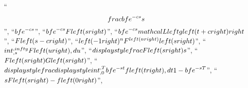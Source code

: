 \documentclass[
  letterpaper,
  DIV=11,
  numbers=noendperiod]{scrartcl}
\begin{document}
``\[\\frac{{{{\\bf{e}}^{ - cs}}}}{s}\]'', ``\({{\\bf{e}}^{ - cs}}\)'',
``\({{\\bf{e}}^{ - cs}}F\\left( s \\right)\)'',
``\({{\\bf{e}}^{ - cs}}{\\mathcal{L}}\\left\\{ {g\\left( {t + c} \\right)} \\right\\}\)'',
``\(F\\left( {s - c} \\right)\)'',
``\({\\left( { - 1} \\right)^n}{F^{\\left( n \\right)}}\\left( s \\right)\)'',
``\(\\int_{{\\,s}}^{{\\,\\infty }}{{F\\left( u \\right)\\,du}}\)'',
``\(\\displaystyle \\frac{{F\\left( s \\right)}}{s}\)'',
``\(F\\left( s \\right)G\\left( s \\right)\)'',
``\(\\displaystyle \\frac{{\\displaystyle \\int_{{\\,0}}^{{\\,T}}{{{{\\bf{e}}^{ - st}}f\\left( t \\right)\\,dt}}}}{{1 - {{\\bf{e}}^{ - sT}}}}\)'',
``\(sF\\left( s \\right) - f\\left( 0 \\right)\)'',
\end{document}
